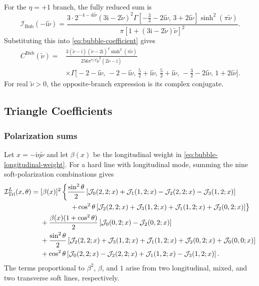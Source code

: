 \documentclass[a4paper,12pt]{article}
\def\ii{\mathrm{i}}
\begin{document}
For the $\eta=+1$ branch, the fully reduced sum is
\begin{equation}
    \mathcal I_{\mathrm{Bub}}(-\ii\tilde\nu)
    =\frac{3\cdot2^{-4-4\ii\tilde\nu}(3\ii-2\tilde\nu)^2
    \Gamma[-\tfrac32-2\ii\tilde\nu,\,3+2\ii\tilde\nu]
    \sinh^2(\pi\tilde\nu)}
    {\pi[1+(3\ii-2\tilde\nu)\tilde\nu]^2}.
    \label{eq:bubble-I-closed}
\end{equation}
Substituting this into \eqref{eq:bubble-coefficient} gives
\begin{align}
    C^{\mathrm{Bub}}(\tilde\nu)
    ={}&\frac{3(\tilde\nu-\ii)(\tilde\nu-2\ii)^4\sinh^2(\pi\tilde\nu)}
    {256\pi^{7/2}\tilde\nu^2(2\tilde\nu-\ii)}
    \nonumber\\
    &\times\Gamma\!\bigl[
    -2-\ii\tilde\nu,\,-2-\ii\tilde\nu,\,
    \tfrac52+\ii\tilde\nu,\,\tfrac52+\ii\tilde\nu,\,
    -\tfrac32-2\ii\tilde\nu,\,1+2\ii\tilde\nu\bigr].
    \label{eq:bubble-C-closed}
\end{align}
For real $\tilde\nu>0$, the opposite-branch expression is its complex conjugate.

\subsection{Triangle Coefficients}
\label{app:triangle-coefficients}
\subsubsection{Polarization sums}
Let $x=-\ii\eta\tilde\nu$ and let $\beta(x)$ be the longitudinal weight in \eqref{eq:bubble-longitudinal-weight}.
For a hard line with longitudinal mode, summing the nine soft-polarization combinations gives
\begin{align}
    \mathcal I^L_{\mathrm{Tri}}(x,\theta)
    ={}&[\beta(x)]^2\left\{
    \frac{\sin^2\theta}{2}\left[
    \mathcal J_0(2,2;x)+\mathcal J_1(1,2;x)
    -\mathcal J_2(2,2;x)-\mathcal J_3(1,2;x)\right]\right.
    \nonumber\\
    &\hspace{15mm}\left.+\cos^2\theta\left[
    \mathcal J_2(2,2;x)+\mathcal J_3(1,2;x)
    +\mathcal J_1(1,2;x)+\mathcal J_2(0,2;x)\right]\right\}
    \nonumber\\
    &+\frac{\beta(x)(1+\cos^2\theta)}2
    \left[\mathcal J_0(0,2;x)-\mathcal J_2(0,2;x)\right]
    \nonumber\\
    &+\frac{\sin^2\theta}{2}\left[
    \mathcal J_2(2,2;x)+\mathcal J_3(1,2;x)
    +\mathcal J_1(1,2;x)+\mathcal J_2(0,2;x)
    +\mathcal J_0(0,0;x)\right]
    \nonumber\\
    &+\cos^2\theta\left[
    \mathcal J_0(2,2;x)-\mathcal J_2(2,2;x)
    +\mathcal J_1(1,2;x)-\mathcal J_3(1,2;x)\right].
    \label{eq:triangle-IL-explicit}
\end{align}
The terms proportional to $\beta^2$, $\beta$, and $1$ arise from two longitudinal, mixed, and two transverse soft lines, respectively.
\end{document}
